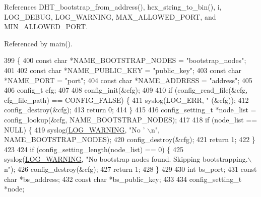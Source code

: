 References D\+H\+T\+\_\+bootstrap\+\_\+from\+\_\+address(), hex\+\_\+string\+\_\+to\+\_\+bin(), i, L\+O\+G\+\_\+\+D\+E\+B\+U\+G, L\+O\+G\+\_\+\+W\+A\+R\+N\+I\+N\+G, M\+A\+X\+\_\+\+A\+L\+L\+O\+W\+E\+D\+\_\+\+P\+O\+R\+T, and M\+I\+N\+\_\+\+A\+L\+L\+O\+W\+E\+D\+\_\+\+P\+O\+R\+T.



Referenced by main().


\begin{DoxyCode}
399 \{
400     \textcolor{keyword}{const} \textcolor{keywordtype}{char} *NAME\_BOOTSTRAP\_NODES = \textcolor{stringliteral}{"bootstrap\_nodes"};
401 
402     \textcolor{keyword}{const} \textcolor{keywordtype}{char} *NAME\_PUBLIC\_KEY = \textcolor{stringliteral}{"public\_key"};
403     \textcolor{keyword}{const} \textcolor{keywordtype}{char} *NAME\_PORT       = \textcolor{stringliteral}{"port"};
404     \textcolor{keyword}{const} \textcolor{keywordtype}{char} *NAME\_ADDRESS    = \textcolor{stringliteral}{"address"};
405 
406     config\_t cfg;
407 
408     config\_init(&cfg);
409 
410     \textcolor{keywordflow}{if} (config\_read\_file(&cfg, cfg\_file\_path) == CONFIG\_FALSE) \{
411         syslog(LOG\_ERR, \textcolor{stringliteral}{"%
      (&cfg));
412         config\_destroy(&cfg);
413         \textcolor{keywordflow}{return} 0;
414     \}
415 
416     config\_setting\_t *node\_list = config\_lookup(&cfg, NAME\_BOOTSTRAP\_NODES);
417 
418     \textcolor{keywordflow}{if} (node\_list == NULL) \{
419         syslog(\hyperlink{logger_8h_aa5a9053636a30269210c54e734e0d583a8f6fe15bfe15104da6d1b360194a5400}{LOG\_WARNING}, \textcolor{stringliteral}{"No '%
      \(\backslash\)n"}, NAME\_BOOTSTRAP\_NODES);
420         config\_destroy(&cfg);
421         \textcolor{keywordflow}{return} 1;
422     \}
423 
424     \textcolor{keywordflow}{if} (config\_setting\_length(node\_list) == 0) \{
425         syslog(\hyperlink{logger_8h_aa5a9053636a30269210c54e734e0d583a8f6fe15bfe15104da6d1b360194a5400}{LOG\_WARNING}, \textcolor{stringliteral}{"No bootstrap nodes found. Skipping bootstrapping.\(\backslash\)n"});
426         config\_destroy(&cfg);
427         \textcolor{keywordflow}{return} 1;
428     \}
429 
430     \textcolor{keywordtype}{int} bs\_port;
431     \textcolor{keyword}{const} \textcolor{keywordtype}{char} *bs\_address;
432     \textcolor{keyword}{const} \textcolor{keywordtype}{char} *bs\_public\_key;
433 
434     config\_setting\_t *node;
}
\end{DoxyCode}
